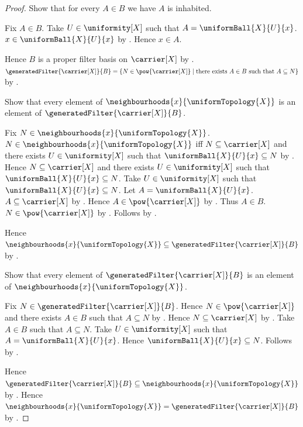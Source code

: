 \begin{proof}
    Show that for every $A\in B$ we have $A$ is inhabited.
    \begin{subproof}
        Fix $A\in B$.
        Take $U\in\uniformity[X]$ such that
            $A=\uniformBall{X}{U}{x}$.
        $x\in\uniformBall{X}{U}{x}$ by
            .
        Hence $x\in A$.
    \end{subproof}
    Hence $B$ is a proper filter basis on $\carrier[X]$ by
        .
    $\generatedFilter{\carrier[X]}{B}
        =\{N\in\pow{\carrier[X]}\mid
            \text{there exists $A\in B$ such that $A\subseteq N$}\}$ by
        .

    Show that every element of
        $\neighbourhoods{x}{\uniformTopology{X}}$ is an element of
        $\generatedFilter{\carrier[X]}{B}$.
    \begin{subproof}
        Fix $N\in\neighbourhoods{x}{\uniformTopology{X}}$.
        $N\in\neighbourhoods{x}{\uniformTopology{X}}$ iff
            $N\subseteq\carrier[X]$ and there exists $U\in\uniformity[X]$
            such that $\uniformBall{X}{U}{x}\subseteq N$ by
            .
        Hence $N\subseteq\carrier[X]$ and there exists
            $U\in\uniformity[X]$ such that
            $\uniformBall{X}{U}{x}\subseteq N$.
        Take $U\in\uniformity[X]$ such that
            $\uniformBall{X}{U}{x}\subseteq N$.
        Let $A=\uniformBall{X}{U}{x}$.
        $A\subseteq\carrier[X]$ by
            .
        Hence $A\in\pow{\carrier[X]}$ by .
        Thus $A\in B$.
        $N\in\pow{\carrier[X]}$ by .
        Follows by \auto.
    \end{subproof}
    Hence $\neighbourhoods{x}{\uniformTopology{X}}
        \subseteq\generatedFilter{\carrier[X]}{B}$ by
        .

    Show that every element of $\generatedFilter{\carrier[X]}{B}$ is
        an element of $\neighbourhoods{x}{\uniformTopology{X}}$.
    \begin{subproof}
        Fix $N\in\generatedFilter{\carrier[X]}{B}$.
        Hence $N\in\pow{\carrier[X]}$ and there exists $A\in B$ such
            that $A\subseteq N$ by \auto.
        Hence $N\subseteq\carrier[X]$ by .
        Take $A\in B$ such that $A\subseteq N$.
        Take $U\in\uniformity[X]$ such that
            $A=\uniformBall{X}{U}{x}$.
        Hence $\uniformBall{X}{U}{x}\subseteq N$.
        Follows by .
    \end{subproof}
    Hence $\generatedFilter{\carrier[X]}{B}
        \subseteq\neighbourhoods{x}{\uniformTopology{X}}$ by
        .
    Hence $\neighbourhoods{x}{\uniformTopology{X}}
        =\generatedFilter{\carrier[X]}{B}$ by
        .
\end{proof}
